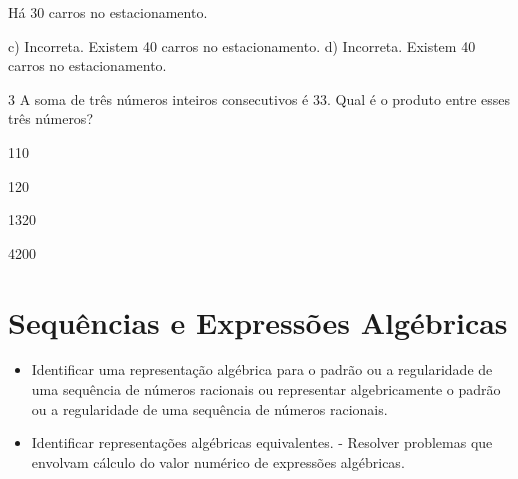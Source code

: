 \begin{escolha}
{{{\begin{escolha}
{Há 30 carros no estacionamento.

c) Incorreta. Existem 40 carros no estacionamento. 
d) Incorreta. Existem 40 carros no estacionamento. 
}

\num{3} A soma de três números inteiros consecutivos é 33. Qual é o produto
entre esses três números?

\begin{escolha}
  \item 110

  \item 120

  \item 1320

  \item 4200
\end{escolha}


\pagestyle{mat}
\chapter{Sequências e Expressões Algébricas}


\begin{itemize}

  \item Identificar uma representação algébrica para o padrão ou a
regularidade de uma sequência de números racionais ou representar
algebricamente o padrão ou a regularidade de uma sequência de
números racionais. 
  \item Identificar representações algébricas equivalentes. - Resolver problemas que envolvam cálculo do valor numérico de
expressões algébricas. 

\end{itemize} 

\end{escolha}}}}
\end{escolha}
